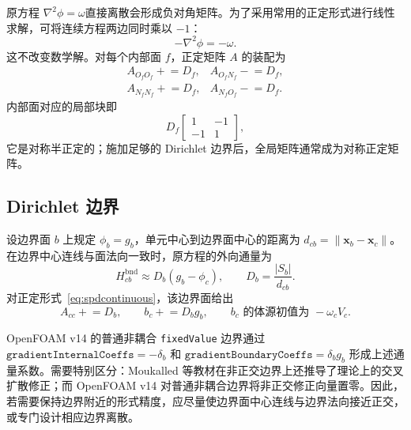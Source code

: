 \documentclass[UTF8,a4paper,11pt]{ctexart}
\newcommand{\vect}[1]{\bm{#1}}
\begin{document}
原方程 \(\nabla^2\phi=\omega\)直接离散会形成负对角矩阵。为了采用常用的正定形式进行线性求解，可将连续方程两边同时乘以 \(-1\)：
\begin{equation}
  -\nabla^2\phi=-\omega .
  \label{eq:spdcontinuous}
\end{equation}
这不改变数学解。对每个内部面 \(f\)，正定矩阵 \(A\) 的装配为
\begin{equation}
\begin{array}{lll}
  A_{O_fO_f}\mathrel{+}=D_f,&
  A_{O_fN_f}\mathrel{-}=D_f,\\[0.25em]
  A_{N_fN_f}\mathrel{+}=D_f,&
  A_{N_fO_f}\mathrel{-}=D_f.
\end{array}
\label{eq:matrixassembly}
\end{equation}
内部面对应的局部块即
\begin{equation}
  D_f
  \begin{bmatrix}1&-1\\-1&1\end{bmatrix},
\end{equation}
它是对称半正定的；施加足够的 Dirichlet 边界后，全局矩阵通常成为对称正定矩阵。

\subsection{Dirichlet 边界}

设边界面 \(b\) 上规定
\(\phi_b=g_b\)，单元中心到边界面中心的距离为
\(d_{cb}=\lVert\vect x_b-\vect x_c\rVert\)。在边界中心连线与面法向一致时，原方程的外向通量为
\begin{equation}
  H_{cb}^{\mathrm{bnd}}
  \approx D_b(g_b-\phi_c),
  \qquad D_b=\frac{|S_b|}{d_{cb}}.
  \label{eq:dirflux}
\end{equation}
对正定形式~\eqref{eq:spdcontinuous}，该边界面给出
\begin{equation}
  A_{cc}\mathrel{+}=D_b,
  \qquad
  b_c\mathrel{+}=D_bg_b,
  \qquad
  b_c\text{ 的体源初值为 }-\omega_cV_c.
  \label{eq:dirassembly}
\end{equation}

OpenFOAM v14 的普通非耦合 \texttt{fixedValue} 边界通过
\(\texttt{gradientInternalCoeffs}=-\delta_b\) 和
\(\texttt{gradientBoundaryCoeffs}=\delta_bg_b\)
形成上述通量系数\cite{OFfixedValue}。需要特别区分：Moukalled 等教材在非正交边界上还推导了理论上的交叉扩散修正\cite[式 (8.81)--(8.83)]{Moukalled2016}；而 OpenFOAM v14 对普通非耦合边界将非正交修正向量置零\cite{OFsurface}。因此，若需要保持边界附近的形式精度，应尽量使边界面中心连线与边界法向接近正交，或专门设计相应边界离散。
\end{document}
